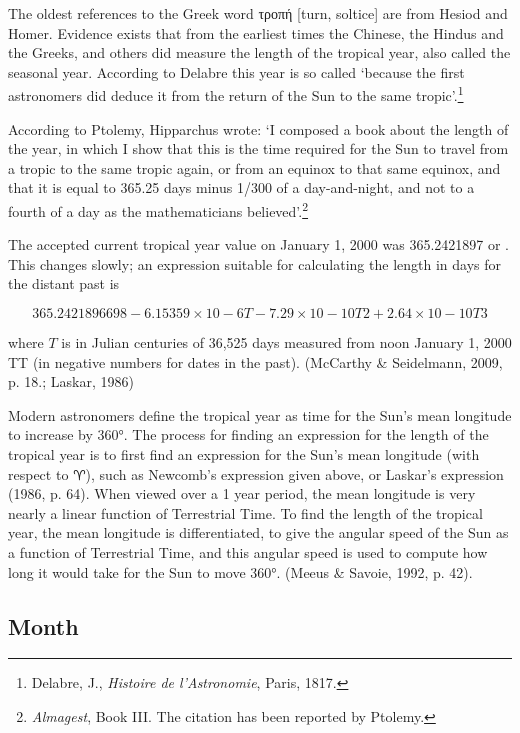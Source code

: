 The oldest references to the Greek word τροπή [turn, soltice] are from Hesiod and Homer. Evidence
exists that from the earliest times the Chinese, the Hindus and the Greeks, and others did measure the
length of the tropical year, also called the seasonal year. According to Delabre this year is so called
`because the first astronomers did deduce it from the return of the Sun to the same tropic’.\footnote{Delabre, J., \textit{Histoire de l’Astronomie}, Paris, 1817.}

According to Ptolemy, Hipparchus wrote: `I composed a book about the length of the year, in which
I show that this is the time required for the Sun to travel from a tropic to the same tropic again, or from
an equinox to that same equinox, and that it is equal to 365.25 days minus 1/300 of a day-and-night, and
not to a fourth of a day as the mathematicians believed’.\footnote{\textit{Almagest}, Book III. The citation has been reported by Ptolemy. }


The accepted current tropical year value on January 1, 2000 was 365.2421897 or  . This changes slowly; an expression suitable for calculating the length in days for the distant past is

\[
365.2421896698 - 6.15359×10-6T- 7.29\times10-10T2 + 2.64×10-10T3
\]

where $T$ is in Julian centuries of 36,525 days measured from noon January 1, 2000 TT (in negative numbers for dates in the past). (McCarthy \& Seidelmann, 2009, p. 18.; Laskar, 1986)

Modern astronomers define the tropical year as time for the Sun's mean longitude to increase by 360°. The process for finding an expression for the length of the tropical year is to first find an expression for the Sun's mean longitude (with respect to ♈), such as Newcomb's expression given above, or Laskar's expression (1986, p. 64). When viewed over a 1 year period, the mean longitude is very nearly a linear function of Terrestrial Time. To find the length of the tropical year, the mean longitude is differentiated, to give the angular speed of the Sun as a function of Terrestrial Time, and this angular speed is used to compute how long it would take for the Sun to move 360°. (Meeus \& Savoie, 1992, p. 42).

\subsection{Month}

